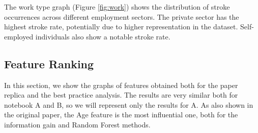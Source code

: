 \documentclass[twocolumn, 9pt]{extarticle}
\begin{document}
The work type graph (Figure \ref{fig:work}) shows the distribution of stroke occurrences across different employment sectors. The private sector has the highest stroke rate, potentially due to higher representation in the dataset. Self-employed individuals also show a notable stroke rate.

\subsection{Feature Ranking}
In this section, we show the graphs of features obtained both for the paper replica and the best practice analysis. The results are very similar both for notebook A and B, so we will represent only the results for A. As also shown in the original paper, the Age feature is the most influential one, both for the information gain and Random Forest methods.
\end{document}
